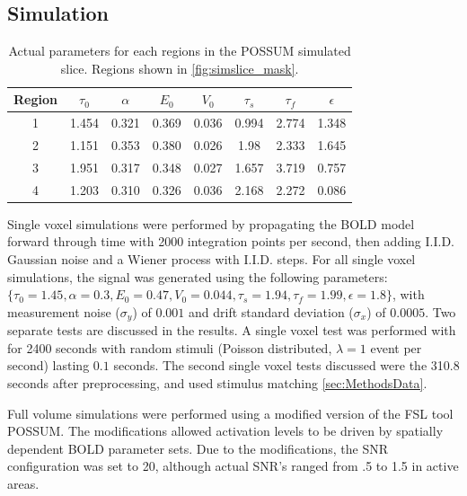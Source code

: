 \documentclass[journal]{./IEEEtran}
\begin{document}
\subsection{Simulation}
\label{sec:MethodsSim}
\begin{table}[t]
\centering
\begin{tabular}{|c |c | c | c | c | c | c | c |}
\hline
Region & $\tau_0$ & $\alpha$ & $E_0$    & $V_0$    & $\tau_s$ & $\tau_f$ & $\epsilon$  \\
\hline
1 & 1.454& 0.321& 0.369& 0.036& 0.994& 2.774& 1.348\\
2 &1.151&  0.353& 0.380& 0.026& 1.98&  2.333& 1.645 \\
3 &1.951&  0.317& 0.348& 0.027& 1.657& 3.719& 0.757 \\
4 &1.203 & 0.310& 0.326& 0.036& 2.168& 2.272& 0.086\\
\hline
\end{tabular}
\caption{Actual parameters for each regions in the POSSUM simulated slice.
Regions shown in \autoref{fig:simslice_mask}.}
\label{tab:simsliceparams}
\end{table}

Single voxel simulations were performed by propagating the BOLD
model forward through time with 2000 integration points per
second, then adding I.I.D. Gaussian noise and a Wiener process
with I.I.D. steps. For all single voxel simulations,
the signal was generated using the following parameters:
$\{\tau_0 = 1.45, \alpha = 0.3, E_0 = 0.47, V_0 = 0.044, 
\tau_s = 1.94, \tau_f = 1.99, \epsilon = 1.8\}$,
with measurement noise ($\sigma_y$) of $0.001$ and drift standard deviation
($\sigma_x$) of $0.0005$. Two separate tests are discussed in the
results. A single voxel test was performed with for 2400 seconds with random
stimuli (Poisson distributed, $\lambda = 1$ event per second) lasting 
$0.1$ seconds. The second single voxel tests discussed were the 310.8
seconds after preprocessing, and used stimulus matching 
\autoref{sec:MethodsData}. 

Full volume simulations were performed using 
a modified version of the FSL tool POSSUM. The modifications allowed
activation levels to be driven by spatially dependent BOLD parameter
sets. Due to the modifications, the SNR configuration was set to 20,
although actual SNR's ranged from .5 to 1.5 in active areas. 
\end{document}
